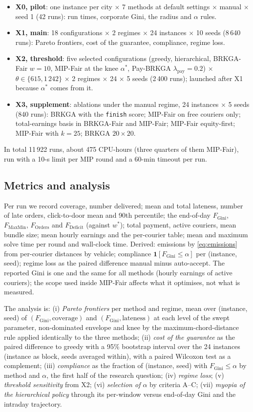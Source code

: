 \documentclass[preprint,12pt,authoryear]{elsarticle}%
\newcommand{\FG}{F_{\text{Gini}}}
\newcommand{\FD}{F_{\text{Deficit}}}
\newcommand{\FO}{F_{\text{Orders}}}
\newcommand{\FM}{F_{\text{MaxMin}}}
\newcommand{\ind}{\mathbf{1}}
\begin{document}
\begin{itemize}
\item \textbf{X0, pilot}: one instance per city $\times$ 7 methods at default settings $\times$ manual $\times$ seed 1 (42 runs): run times, corporate Gini, the radius and $\alpha$ rules.
\item \textbf{X1, main}: 18 configurations $\times$ 2 regimes $\times$ 24 instances $\times$ 10 seeds (8\,640 runs): Pareto frontiers, cost of the guarantee, compliance, regime loss.
\item \textbf{X2, threshold}: five selected configurations (greedy, hierarchical, BRKGA-Fair $w = 10$, MIP-Fair at the knee $\alpha^*$, Pay-BRKGA $\lambda_{\text{pay}} = 0.2$) $\times$ $\theta \in \{615, 1\,242\}$ $\times$ 2 regimes $\times$ 24 $\times$ 5 seeds (2\,400 runs); launched after X1 because $\alpha^*$ comes from it.
\item \textbf{X3, supplement}: ablations under the manual regime, 24 instances $\times$ 5 seeds (840 runs): BRKGA with the \texttt{finish} score; MIP-Fair on free couriers only; total-earnings basis in BRKGA-Fair and MIP-Fair; MIP-Fair equity-first; MIP-Fair with $k = 25$; BRKGA $20 \times 20$.
\end{itemize}
In total 11\,922 runs, about 475 CPU-hours (three quarters of them MIP-Fair), run with a 10-s limit per MIP round and a 60-min timeout per run.

\subsection{Metrics and analysis}

Per run we record coverage, number delivered; mean and total lateness, number of late orders, click-to-door mean and 90th percentile; the end-of-day $\FG$, $\FM$, $\FO$ and $\FD$ (against $w^*$); total payment, active couriers, mean bundle size; mean hourly earnings and the per-courier table; mean and maximum solve time per round and wall-clock time. Derived: emissions by \eqref{eq:emissions} from per-courier distances by vehicle; compliance $\ind[\FG \le \alpha]$ per (instance, seed); regime loss as the paired difference manual minus auto-accept. The reported Gini is one and the same for all methods (hourly earnings of active couriers); the scope used inside MIP-Fair affects what it optimises, not what is measured.

The analysis is: (i) \emph{Pareto frontiers} per method and regime, mean over (instance, seed) of $(\FG, \text{coverage})$ and $(\FG, \text{lateness})$ at each level of the swept parameter, non-dominated envelope and knee by the maximum-chord-distance rule applied identically to the three methods; (ii) \emph{cost of the guarantee} as the paired difference to greedy with a 95\% bootstrap interval over the 24 instances (instance as block, seeds averaged within), with a paired Wilcoxon test as a complement; (iii) \emph{compliance} as the fraction of (instance, seed) with $\FG \le \alpha$ by method and $\alpha$, the first half of the research question; (iv) \emph{regime loss}; (v) \emph{threshold sensitivity} from X2; (vi) \emph{selection of $\alpha$} by criteria A--C; (vii) \emph{myopia of the hierarchical policy} through its per-window versus end-of-day Gini and the intraday trajectory.
\end{document}
